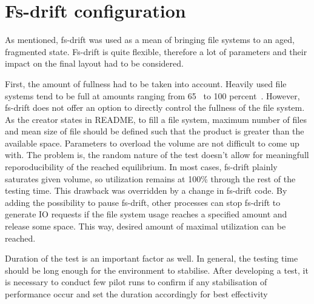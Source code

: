 \documentclass[
  color, %
  table, %
  lof,   %
  lot,   %
]{fithesis3}
\begin{document}
\section{Fs-drift configuration}
As mentioned, fs-drift was used as a mean of bringing file systems to an aged, fragmented state. Fs-drift is quite flexible, therefore a lot of parameters and their impact on the final layout had to be considered.

First, the amount of fullness had to be taken into account. Heavily used file systems tend to be full at amounts ranging from 65~\cite{Smith:1997:FSA:258623.258689} to 100 percent~\cite{agrawal2007five}. However, fs-drift does not offer an option to directly control the fullness of the file system. As the creator states in README, to fill a file system, maximum number of files and mean size of file should be defined such that the product is greater than the available space. Parameters to overload the volume are not difficult to come up with. The problem is, the random nature of the test doesn't allow for meaningfull reporoducibility of the reached equilibrium. In most cases, fs-drift plainly saturates given volume, so utilization remains at 100\% through the rest of the testing time. This drawback was overridden by a change in fs-drift code\footnotemark[1]. By adding the possibility to pause fs-drift, other processes can stop fs-drift to generate IO requests if the file system usage reaches a specified amount and release some space. This way, desired amount of maximal utilization can be reached.


Duration of the test is an important factor as well. In general, the testing time should be long enough for the environment to stabilise. After developing a test, it is necessary to conduct few pilot runs to confirm if any stabilisation of performance occur and set the duration accordingly for best effectivity






\end{document}
